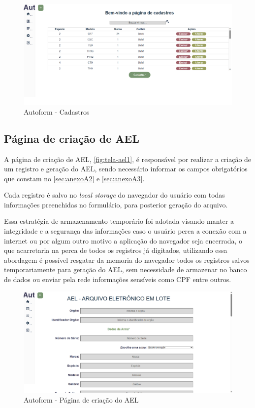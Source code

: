 \begin{figure}[H]
    \caption{\label{fig:tela-cadastros-armas}Autoform - Cadastros}
    \begin{center}
        \includegraphics[scale=0.5]{imagens/autoform-cadastros.png}
    \end{center}
\end{figure}

\subsection{Página de criação de AEL}
A página de criação de AEL, \autoref{fig:tela-ael1}, é responsável por realizar a criação de um registro e geração do AEL, sendo necessário informar os campos obrigatórios que constam no \autoref{sec:anexoA2} e \autoref{sec:anexoA3}.

Cada registro é salvo no \textit{local storage} do navegador do usuário com todas informações preenchidas no formulário, para posterior geração do arquivo. 

Essa estratégia de armazenamento temporário foi adotada visando manter a integridade e a segurança das informações caso o usuário perca a conexão com a internet ou por algum outro motivo a aplicação do navegador seja encerrada, o que acarretaria na perca de todos os registros já digitados, utilizando essa abordagem é possível resgatar da memoria do navegador todos os registros salvos temporariamente para geração do AEL, sem necessidade de armazenar no banco de dados ou enviar pela rede informações sensíveis como CPF entre outros. 
\begin{figure}[htb]
    \caption{\label{fig:tela-ael1}Autoform - Página de criação do AEL}
    \begin{center}
        \includegraphics[scale=0.5]{imagens/autoform-ael-gerar.png}
    \end{center}
\end{figure}

